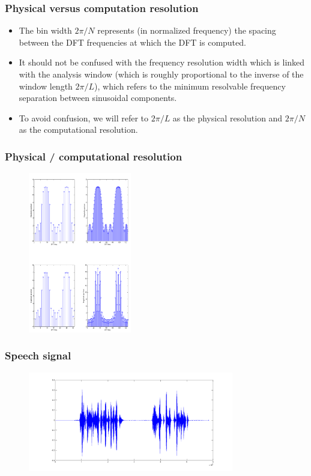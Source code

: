 \begin{frame}
\frametitle{Physical versus computation resolution}
\begin{itemize}
\item The bin width $2 \pi / N$ represents (in normalized frequency) the spacing between the DFT frequencies at which the DFT is computed.
\item It \alert{should not} be confused with the \alert{frequency resolution width} which is linked with the analysis window (which is roughly proportional to the inverse of the window length $2 \pi / L$), which refers to the minimum \alert{resolvable} frequency separation between
    sinusoidal components.
\item To avoid confusion, we will refer to $2 \pi /L$ as the \alert{physical resolution} and $2 \pi / N$ as the \alert{computational resolution}.
\end{itemize}
\end{frame}

\begin{frame}
\frametitle{Physical / computational resolution}
\begin{figure}
  \centering
  \includegraphics[width=0.4\textwidth]{3sinewaves.png}\\
\end{figure}
\end{frame}


\begin{frame}
\frametitle{Speech signal}
\begin{figure}
  \centering
  \includegraphics[width=0.8\textwidth]{speech}
\end{figure}
\end{frame}

